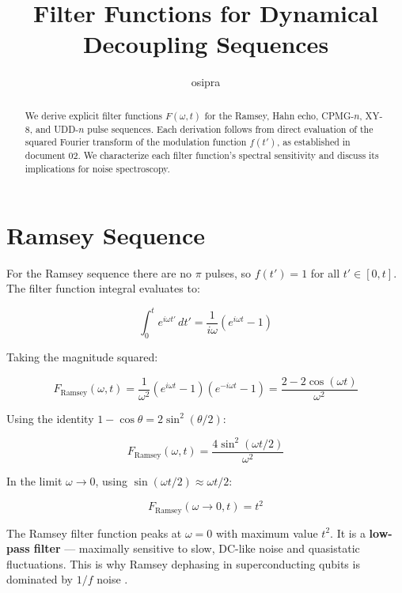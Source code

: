 \documentclass[12pt]{article}
\title{Filter Functions for Dynamical Decoupling Sequences}
\author{osipra}
\date{}
\begin{document}
\maketitle

\begin{abstract}
We derive explicit filter functions $F(\omega, t)$ for the Ramsey, Hahn echo, CPMG-$n$, XY-8, and UDD-$n$ pulse sequences. Each derivation follows from direct evaluation of the squared Fourier transform of the modulation function $f(t')$, as established in document 02. We characterize each filter function's spectral sensitivity and discuss its implications for noise spectroscopy.
\end{abstract}

\section{Ramsey Sequence}

For the Ramsey sequence there are no $\pi$ pulses, so $f(t') = 1$ for all $t' \in [0, t]$. The filter function integral evaluates to:

\begin{equation}
    \int_0^t e^{i\omega t'}\, dt' = \frac{1}{i\omega}\left(e^{i\omega t} - 1\right)
\end{equation}

Taking the magnitude squared:

\begin{equation}
    F_\text{Ramsey}(\omega, t) = \frac{1}{\omega^2}\left(e^{i\omega t} - 1\right)\left(e^{-i\omega t} - 1\right) = \frac{2 - 2\cos(\omega t)}{\omega^2}
\end{equation}

Using the identity $1 - \cos\theta = 2\sin^2(\theta/2)$:

\begin{equation}
    \boxed{F_\text{Ramsey}(\omega, t) = \frac{4\sin^2(\omega t/2)}{\omega^2}}
\end{equation}

In the limit $\omega \to 0$, using $\sin(\omega t/2) \approx \omega t/2$:

\begin{equation}
    F_\text{Ramsey}(\omega \to 0, t) = t^2
\end{equation}

The Ramsey filter function peaks at $\omega = 0$ with maximum value $t^2$. It is a \textbf{low-pass filter} — maximally sensitive to slow, DC-like noise and quasistatic fluctuations. This is why Ramsey dephasing in superconducting qubits is dominated by $1/f$ noise \cite{Bylander2011}.
\end{document}

